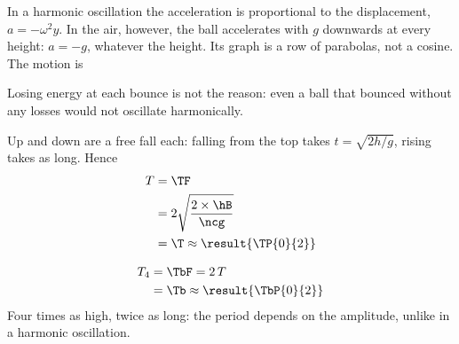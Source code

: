 \begin{abcliste}
\abc
In a harmonic oscillation the acceleration is proportional to the displacement, $a = -\omega^2 y$. In the air, however, the ball accelerates with $g$ downwards at every height: $a = -g$, whatever the height. Its graph is a row of parabolas, not a cosine. The motion is 

Losing energy at each bounce is not the reason: even a ball that bounced without any losses would not oscillate harmonically.

\abc
Up and down are a free fall each: falling from the top takes $t = \sqrt{2h/g}$, rising takes as long. Hence
\begin{align}
 T &= \TF \\
   &= 2\sqrt{\frac{2\times\hB}{\ncg}} \\
   &= \T \approx \result{\TP{0}{2}}
\end{align}

\abc
\begin{align}
 T_4 &= \TbF = 2\,T \\
   &= \Tb \approx \result{\TbP{0}{2}}
\end{align}
Four times as high, twice as long: the period depends on the amplitude, unlike in a harmonic oscillation.
\end{abcliste}
